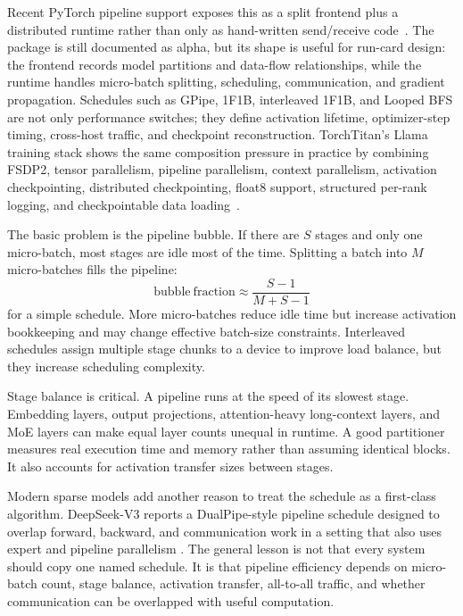 Recent PyTorch pipeline support exposes this as a split frontend plus a distributed runtime rather than only as hand-written send/receive code~\cite{pytorch2026pipelining}. The package is still documented as alpha, but its shape is useful for run-card design: the frontend records model partitions and data-flow relationships, while the runtime handles micro-batch splitting, scheduling, communication, and gradient propagation. Schedules such as GPipe, 1F1B, interleaved 1F1B, and Looped BFS are not only performance switches; they define activation lifetime, optimizer-step timing, cross-host traffic, and checkpoint reconstruction. TorchTitan's Llama training stack shows the same composition pressure in practice by combining FSDP2, tensor parallelism, pipeline parallelism, context parallelism, activation checkpointing, distributed checkpointing, float8 support, structured per-rank logging, and checkpointable data loading~\cite{pytorch2026torchtitan}.

The basic problem is the pipeline bubble. If there are $S$ stages and only one micro-batch, most stages are idle most of the time. Splitting a batch into $M$ micro-batches fills the pipeline:
\begin{equation}
  \mathrm{bubble\ fraction} \approx \frac{S-1}{M+S-1}
\end{equation}
for a simple schedule. More micro-batches reduce idle time but increase activation bookkeeping and may change effective batch-size constraints. Interleaved schedules assign multiple stage chunks to a device to improve load balance, but they increase scheduling complexity.

Stage balance is critical. A pipeline runs at the speed of its slowest stage. Embedding layers, output projections, attention-heavy long-context layers, and MoE layers can make equal layer counts unequal in runtime. A good partitioner measures real execution time and memory rather than assuming identical blocks. It also accounts for activation transfer sizes between stages.

Modern sparse models add another reason to treat the schedule as a first-class algorithm. DeepSeek-V3 reports a DualPipe-style pipeline schedule designed to overlap forward, backward, and communication work in a setting that also uses expert and pipeline parallelism \cite{deepseek2024v3}. The general lesson is not that every system should copy one named schedule. It is that pipeline efficiency depends on micro-batch count, stage balance, activation transfer, all-to-all traffic, and whether communication can be overlapped with useful computation.

